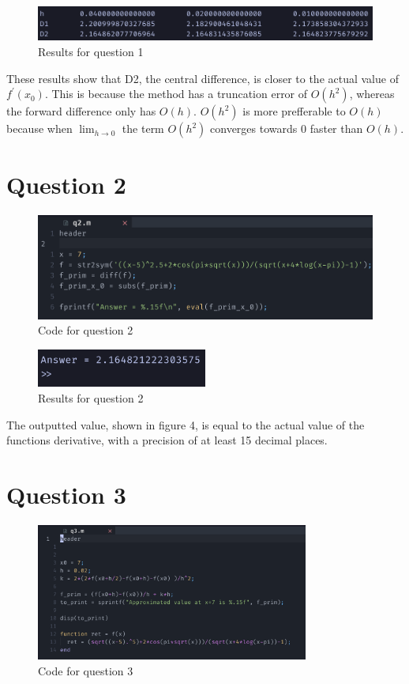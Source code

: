 \documentclass{article}
\begin{document}
\begin{figure}[h]
	\centering
	\includegraphics[width=\textwidth]{imgs/q1_results.png}
	\caption{Results for question 1}
	\label{fig:q1_results}
\end{figure}

These results show that D2, the central difference, is closer to the actual value of $f^\prime(x_0)$. This is because the method has a
truncation error of $O(h^2)$, whereas the forward difference only has $O(h)$. $O(h^{2})$ is more prefferable to $O(h)$ because when $\lim_{h \to 0}$ the term $O(h^{2})$ converges towards $0$ faster than $O(h)$.

\newpage
\section{Question 2}
\begin{figure}[H]
	\centering
	\includegraphics[width=\textwidth{}]{imgs/q2_code.png}
	\caption{Code for question 2}
	\label{fig:q2_code}
\end{figure}

\begin{figure}[H]
	\centering
	\includegraphics[width=0.5\textwidth]{imgs/q2_results.png}
	\caption{Results for question 2}
	\label{fig:q2_results}
\end{figure}
The outputted value, shown in figure 4, is equal to the actual value of the functions derivative, with a precision of at least 15 decimal places.

\newpage
\section{Question 3}
\begin{figure}[H]
	\centering
	\includegraphics[width=0.8\textwidth]{imgs/q3_code.png}
	\caption{Code for question 3}
	\label{fig:q3_code}
\end{figure}
\end{document}
